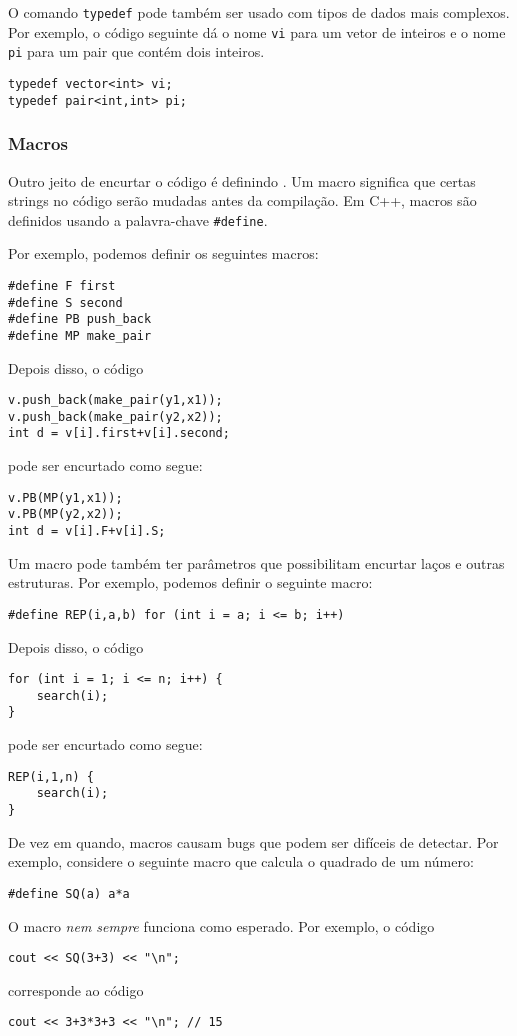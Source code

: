 O comando \texttt{typedef}
pode também ser usado com tipos de dados mais complexos.
Por exemplo, o código seguinte dá
o nome \texttt{vi} para um vetor de inteiros
e o nome \texttt{pi} para um pair
que contém dois inteiros.
\begin{lstlisting}
typedef vector<int> vi;
typedef pair<int,int> pi;
\end{lstlisting}

\subsubsection{Macros}
Outro jeito de encurtar o código é definindo .
Um macro significa que certas strings no código serão mudadas antes da compilação.
Em C++, macros são definidos usando a palavra-chave \texttt{\#define}.

Por exemplo, podemos definir os seguintes macros:
\begin{lstlisting}
#define F first
#define S second
#define PB push_back
#define MP make_pair
\end{lstlisting}
Depois disso, o código
\begin{lstlisting}
v.push_back(make_pair(y1,x1));
v.push_back(make_pair(y2,x2));
int d = v[i].first+v[i].second;
\end{lstlisting}
pode ser encurtado como segue:
\begin{lstlisting}
v.PB(MP(y1,x1));
v.PB(MP(y2,x2));
int d = v[i].F+v[i].S;
\end{lstlisting}

Um macro pode também ter parâmetros que possibilitam encurtar laços e outras estruturas.
Por exemplo, podemos definir o seguinte macro:
\begin{lstlisting}
#define REP(i,a,b) for (int i = a; i <= b; i++)
\end{lstlisting}
Depois disso, o código
\begin{lstlisting}
for (int i = 1; i <= n; i++) {
    search(i);
}
\end{lstlisting}
pode ser encurtado como segue:
\begin{lstlisting}
REP(i,1,n) {
    search(i);
}
\end{lstlisting}

De vez em quando, macros causam bugs que podem ser difíceis de detectar.
Por exemplo, considere o seguinte macro que calcula o quadrado de um número:
\begin{lstlisting}
#define SQ(a) a*a
\end{lstlisting}
O macro \emph{nem sempre} funciona como esperado.
Por exemplo, o código
\begin{lstlisting}
cout << SQ(3+3) << "\n";
\end{lstlisting}
corresponde ao código
\begin{lstlisting}
cout << 3+3*3+3 << "\n"; // 15
\end{lstlisting}

